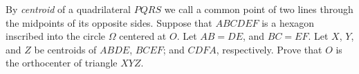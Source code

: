 By \textit{centroid} of a quadrilateral $PQRS$ we call a common point of two lines through the midpoints of its opposite sides. Suppose that $ABCDEF$ is a hexagon inscribed into the circle $\Omega$ centered at $O$. Let  $AB=DE$, and  $BC=EF$. Let $X$, $Y$, and $Z$ be centroids of $ABDE$, $BCEF$; and $CDFA$, respectively. Prove that $O$ is the orthocenter of triangle $XYZ$.